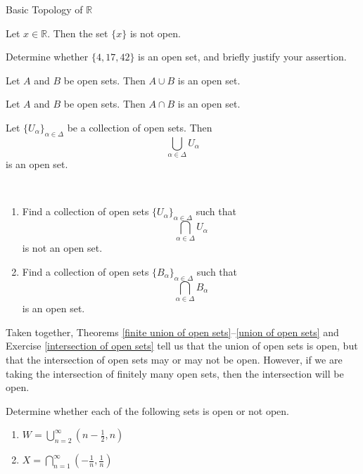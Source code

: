 \begin{section}{Basic Topology of $\mathbb{R}$}
\begin{theorem}
Let $x\in\mathbb{R}$.  Then the set $\{x\}$ is not open.
\end{theorem}

\begin{exercise} 
Determine whether $\{4,17,42\}$ is an open set, and briefly justify your assertion. 
\end{exercise}

\begin{theorem}[*]\label{finite union of open sets}
Let $A$ and $B$ be open sets.  Then $A\cup B$ is an open set. 
\end{theorem}

\begin{theorem}[*]\label{finite intersection of open sets}
Let $A$ and $B$ be open sets.  Then $A\cap B$ is an open set.
\end{theorem}

\begin{theorem}[*]\label{union of open sets}
Let $\{U_{\alpha}\}_{\alpha\in\Delta}$ be a collection of open sets.  Then
\[
\bigcup_{\alpha\in\Delta} U_{\alpha}
\]
is an open set.
\end{theorem}

\begin{exercise}\label{intersection of open sets}\
\begin{enumerate}
\item Find a collection of open sets $\{U_{\alpha}\}_{\alpha\in\Delta}$ such that
\[
\bigcap_{\alpha\in\Delta} U_{\alpha}
\]
is not an open set.
\item Find a collection of open sets $\{B_{\alpha}\}_{\alpha\in\Delta}$ such that
\[
\bigcap_{\alpha\in\Delta} B_{\alpha}
\]
is an open set.
\end{enumerate}
\end{exercise}

\begin{remark}\label{union vs intersection of open sets}
Taken together, Theorems \ref{finite union of open sets}--\ref{union of open sets} and Exercise \ref{intersection of open sets} tell us that the union of open sets is open, but that the intersection of open sets may or may not be open.  However, if we are taking the intersection of finitely many open sets, then the intersection will be open.
\end{remark}

\begin{exercise}
Determine whether each of the following sets is open or not open.
\begin{enumerate}
\item $\displaystyle W=\bigcup_{n=2}^{\infty} \left(n - \frac{1}{2},n\right)$
\item $\displaystyle X=\bigcap_{n=1}^{\infty} \left(-\frac{1}{n}, \frac{1}{n}\right)$
\end{enumerate}
\end{exercise}


\end{section}
